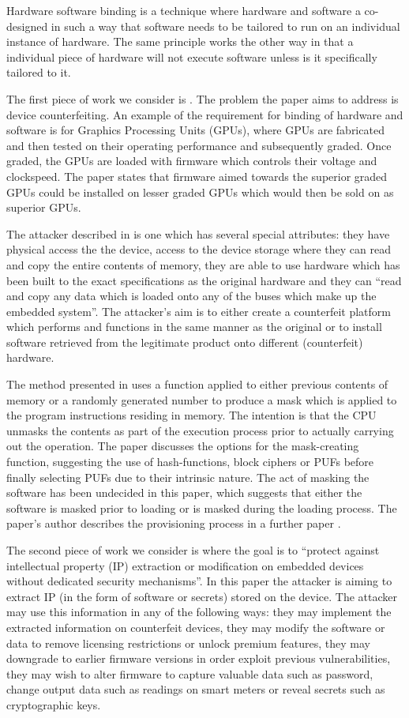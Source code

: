 Hardware software binding is a technique where hardware and software a co-designed in such a way that software needs to be tailored to run on an individual instance of hardware. The same principle works the other way in that a individual piece of hardware will not execute software unless is it specifically tailored to it.

The first piece of work we consider is \cite{Lee2016}. The problem the paper aims to address is device counterfeiting. An example of the requirement for binding of hardware and software is for Graphics Processing Units (GPUs), where GPUs are fabricated and then tested on their operating performance and subsequently graded. Once graded, the GPUs are loaded with firmware which controls their voltage and clockspeed. The paper states that firmware aimed towards the superior graded GPUs could be installed on lesser graded GPUs which would then be sold on as superior GPUs.

The attacker described in \cite{Lee2016} is one which has several special attributes: they have physical access the the device, access to the device storage where they can read and copy the entire contents of memory, they are able to use hardware which has been built to the exact specifications as the original hardware and they can ``read and copy any data which is loaded onto any of the buses which make up the embedded system''. The attacker's aim is to either create a counterfeit platform which performs and functions in the same manner as the original or to install software retrieved from the legitimate product onto different (counterfeit) hardware.

The method presented in \cite{Lee2016} uses a function applied to either previous contents of memory or a randomly generated number to produce a mask which is applied to the program instructions residing in memory. The intention is that the CPU unmasks the contents as part of the execution process prior to actually carrying out the operation. The paper discusses the options for the mask-creating function, suggesting the use of hash-functions, block ciphers or PUFs before finally selecting PUFs due to their intrinsic nature. The act of masking the software has been undecided in this paper, which suggests that either the software is masked prior to loading or is masked during the loading process. The paper's author describes the provisioning process in a further paper \cite{Lee2017}.


The second piece of work we consider is \cite{Schaller2014} where the goal is to ``protect against intellectual property (IP) extraction or modification on embedded devices without dedicated security mechanisms''. In this paper the attacker is aiming to extract IP (in the form of software or secrets) stored on the device. The attacker may use this information in any of the following ways: they may implement the extracted information on counterfeit devices, they may modify the software or data to remove licensing restrictions or unlock premium features, they may downgrade to earlier firmware versions  in order exploit previous vulnerabilities, they may wish to alter firmware to capture valuable data such as password, change output data such as readings on smart meters or reveal secrets such as cryptographic keys.

